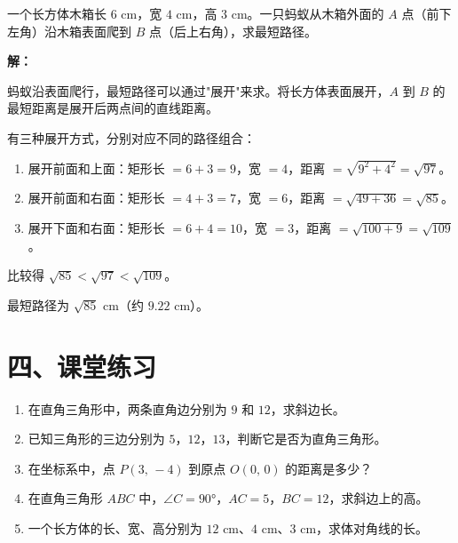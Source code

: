 \documentclass[12pt, a4paper]{ctexart}
\begin{document}
\vspace{6pt}

\begin{appbox}[【应用4】蚂蚁爬行最短路径]
一个长方体木箱长 $6$ cm，宽 $4$ cm，高 $3$ cm。一只蚂蚁从木箱外面的 $A$ 点（前下左角）沿木箱表面爬到 $B$ 点（后上右角），求最短路径。

\begin{center}
\end{center}
\end{appbox}

\textbf{解：}

蚂蚁沿表面爬行，最短路径可以通过"展开"来求。将长方体表面展开，$A$ 到 $B$ 的最短距离是展开后两点间的直线距离。

有三种展开方式，分别对应不同的路径组合：
\begin{enumerate}[label=(\arabic*)]
  \item 展开前面和上面：矩形长 $= 6+3 = 9$，宽 $= 4$，距离 $= \sqrt{9^2+4^2} = \sqrt{97}$。
  \item 展开前面和右面：矩形长 $= 4+3 = 7$，宽 $= 6$，距离 $= \sqrt{49+36} = \sqrt{85}$。
  \item 展开下面和右面：矩形长 $= 6+4 = 10$，宽 $= 3$，距离 $= \sqrt{100+9} = \sqrt{109}$。
\end{enumerate}

比较得 $\sqrt{85} < \sqrt{97} < \sqrt{109}$。

最短路径为 $\boxed{\sqrt{85}}$ cm（约 $9.22$ cm）。

\section*{\textcolor{tipgreen}{四、课堂练习}}

\begin{enumerate}
  \item 在直角三角形中，两条直角边分别为 $9$ 和 $12$，求斜边长。
  \item 已知三角形的三边分别为 $5$，$12$，$13$，判断它是否为直角三角形。
  \item 在坐标系中，点 $P(3,\, -4)$ 到原点 $O(0,\, 0)$ 的距离是多少？
  \item 在直角三角形 $ABC$ 中，$\angle C = 90°$，$AC = 5$，$BC = 12$，求斜边上的高。
  \item 一个长方体的长、宽、高分别为 $12$ cm、$4$ cm、$3$ cm，求体对角线的长。
\end{enumerate}
\end{document}
